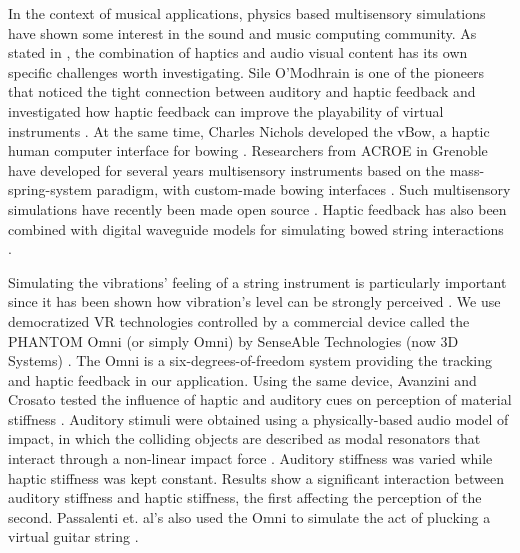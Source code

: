 \documentclass[dvipsnames, pdftex]{article}
\begin{document}
In the context of musical applications, physics based multisensory simulations have shown some interest in the sound and music computing community. 
As stated in 
\cite{danieau2012enhancing}, the combination of haptics and audio visual content has its own specific challenges worth investigating.
Sile O'Modhrain is one of the pioneers that noticed the tight connection between auditory and haptic feedback and investigated how haptic feedback can improve the playability of virtual instruments \cite{o2001playing}.
At the same time, Charles Nichols developed the vBow, a haptic human computer interface for bowing \cite{nichols2002vbow}.
Researchers from ACROE in Grenoble have developed for several years multisensory instruments based on the mass-spring-system paradigm, with custom-made bowing interfaces \cite{florens1990modeles,luciani2005action}.
Such multisensory simulations have recently been made open source \cite{villeneuve2019mass}.
Haptic feedback has also been combined with digital waveguide models for simulating bowed string interactions \cite{sinclair2009audio}.

Simulating the vibrations' feeling of a string instrument is particularly important since it has been shown how vibration's level can be strongly perceived \cite{askenfelt1992vibration}. 
We use democratized VR technologies controlled by a commercial device called the PHANTOM Omni (or simply Omni) by SenseAble Technologies (now 3D Systems) \cite{phantom}.
The Omni is a six-degrees-of-freedom system providing the tracking and haptic feedback in our application.
Using the same device, Avanzini and Crosato tested the influence of haptic and auditory cues on perception of material stiffness   \cite{avanzini2006}.
Auditory stimuli were obtained using a physically-based audio model of impact, in which the colliding objects are described as modal resonators that interact through a non-linear impact force \cite{avanzini2004physical}.
Auditory stiffness was varied while haptic stiffness was kept constant. Results show a significant interaction between auditory stiffness and haptic stiffness, the first affecting the perception of the second. Passalenti et. al's also used the Omni to simulate the act of plucking a virtual guitar string \cite{passalenti2019a, passalenti2019b, Fontana2020}.

\end{document}
